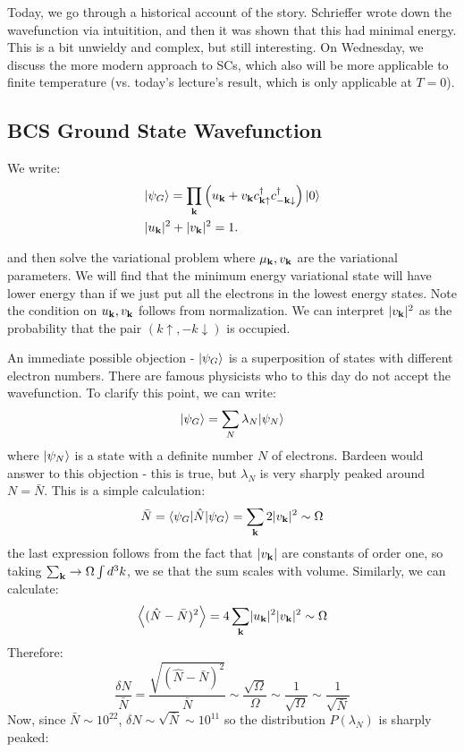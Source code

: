 Today, we go through a historical account of the story. Schrieffer wrote down the wavefunction via intuitition, and then it was shown that this had minimal energy. This is a bit unwieldy and complex, but still interesting. On Wednesday, we discuss the more modern approach to SCs, which also will be more applicable to finite temperature (vs. today's lecture's result, which is only applicable at $T = 0$).

\subsection{BCS Ground State Wavefunction}
We write:
\begin{equation}\label{eq-ukvknormalization}
    \begin{split}
        &\lvert \psi_G \rangle = \prod_{\mathbf{k}} \left(u_{\mathbf{k}} + v_{\mathbf{k}} c^\dagger_{\mathbf{k}\uparrow}c^\dagger_{-\mathbf{k}\downarrow}\right)\lvert 0 \rangle
        \\ &\lvert u_{\mathbf{k}} \rvert^2 + \lvert v_{\mathbf{k}} \rvert^2 = 1.
    \end{split}
\end{equation}

and then solve the variational problem where $\mu_{\mathbf{k}}, v_{\mathbf{k}}$ are the variational parameters. We will find that the minimum energy variational state will have lower energy than if we just put all the electrons in the lowest energy states. Note the condition on $u_{\mathbf{k}}, v_{\mathbf{k}}$ follows from normalization. We can interpret $\lvert v_{\mathbf{k}} \rvert^2$ as the probability that the pair $(k\uparrow, -k\downarrow)$ is occupied.

An immediate possible objection - $\lvert \psi_G \rangle$ is a superposition of states with different electron numbers. There are famous physicists who to this day do not accept the wavefunction. To clarify this point, we can write:
\begin{align*}
    \lvert \psi_G \rangle = \sum_N \lambda_N \lvert \psi_N \rangle
\end{align*}
where $\lvert \psi_N \rangle$ is a state with a definite number $N$ of electrons. Bardeen would answer to this objection - this is true, but $\lambda_N$ is very sharply peaked around $N = \bar{N}$. This is a simple calculation:
\begin{equation}
    \bar{N} = \langle \psi_G \rvert\hat{N}\lvert \psi_G \rangle = \sum_{\mathbf{k}} 2\lvert v_{\mathbf{k}} \rvert^2 \sim \Omega
\end{equation}
the last expression follows from the fact that $\lvert v_{\mathbf{k}} \rvert$ are constants of order one, so taking $\sum_{\mathbf{k}} \to \Omega \int d^3k$, we se that the sum scales with volume. Similarly, we can calculate:
\begin{align*}
    \left< (\hat{N} - \bar{N})^2 \right> = 4\sum_{\mathbf{k}}\lvert u_{\mathbf{k}} \rvert^2\lvert v_{\mathbf{k}} \rvert^2 \sim \Omega
\end{align*}
Therefore:
\begin{equation}
    \frac{\delta N}{\bar{N}} = \frac{\sqrt{(\hat{N} - \bar{N})^2}}{\bar{N}} \sim \frac{\sqrt{\Omega}}{\Omega} \sim \frac{1}{\sqrt{\Omega}} \sim \frac{1}{\sqrt{\bar{N}}}
\end{equation}
Now, since $\bar{N} \sim 10^{22}$, $\delta N \sim \sqrt{\bar{N}} \sim 10^{11}$ so the distribution $P(\lambda_N)$ is sharply peaked:

